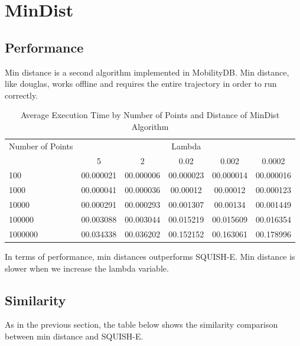 \section{MinDist}
\subsection{Performance}
Min distance is a second algorithm implemented in MobilityDB. Min distance, like douglas, works offline and requires the entire trajectory in order to run correctly. %
\begin{table}[htbp]
    \centering
    \label{tab:execution_time_mindist}
    \begin{tabular}{@{}lccccc@{}}
        \toprule
        Number of Points & \multicolumn{5}{c}{Lambda} \\
        \cmidrule{2-6}
        & 5         & 2       & 0.02        & 0.002       & 0.0002       \\
        \midrule
        100              & 00.000021 & 00.000006 & 00.000023 & 00.000014 & 00.000016 \\
        1000             & 00.000041  & 00.000036 & 00.00012 & 00.00012 & 00.000123 \\
        10000            & 00.000291 & 00.000293 & 00.001307 & 00.00134 & 00.001449 \\
        100000           & 00.003088  & 00.003044  & 00.015219 & 00.015609 & 00.016354 \\
        1000000          & 00.034338 & 00.036202 & 00.152152 & 00.163061 & 00.178996 \\
        \bottomrule
    \end{tabular}
    \caption{Average Execution Time by Number of Points and Distance of MinDist Algorithm}
\end{table}

In terms of performance, min distances outperforms SQUISH-E. Min distance is slower when we increase the lambda variable.

\subsection{Similarity}
As in the previous section, the table below shows the similarity comparison between min distance and SQUISH-E.

